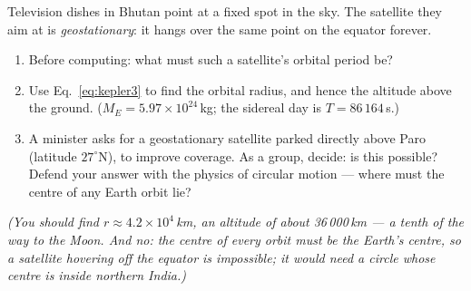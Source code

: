 \begin{whiteboard}
Television dishes in Bhutan point at a fixed spot in the sky. The satellite
they aim at is \emph{geostationary}: it hangs over the same point on the
equator forever.
\begin{enumerate}[label=(\alph*), leftmargin=2.5em, itemsep=1pt]
  \item Before computing: what must such a satellite's orbital period be?
  \item Use Eq.~\eqref{eq:kepler3} to find the orbital radius, and hence the
        altitude above the ground. ($M_E = 5.97\times10^{24}$\,kg; the
        sidereal day is $T = 86\,164$\,s.)
  \item A minister asks for a geostationary satellite parked directly above
        Paro (latitude $27^\circ$N), to improve coverage. As a group, decide:
        is this possible? Defend your answer with the physics of circular
        motion --- where must the centre of any Earth orbit lie?
\end{enumerate}
\textit{(You should find $r \approx 4.2\times10^4$\,km, an altitude of about
36\,000\,km --- a tenth of the way to the Moon. And no: the centre of every
orbit must be the Earth's centre, so a satellite hovering off the equator is
impossible; it would need a circle whose centre is inside northern India.)}
\end{whiteboard}

